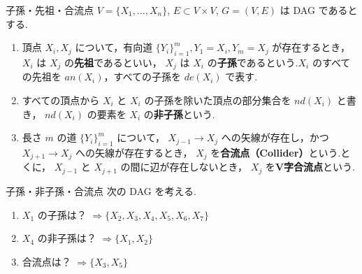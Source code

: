 \documentclass[uplatex, dvipdfmx]{jsarticle}
\begin{document}
\newpage

\begin{defn}{子孫・先祖・合流点}
$V = \{X_1, \dots, X_n\}$, $E \subset V \times V$, $G = (V, E)$ は DAG であるとする.
  \begin{enumerate}
      \item 頂点 $X_i, X_j$ について，有向道 $\{Y_i\}_{i=1}^m, Y_1 = X_i, Y_m = X_j$ が存在するとき， $X_i$ は $X_j$ の\textbf{先祖}であるといい， $X_j$ は $X_i$ の\textbf{子孫}であるという.$X_i$ のすべての先祖を $an(X_i)$，すべての子孫を $de(X_i)$ で表す.
      \item すべての頂点から $X_i$ と $X_i$ の子孫を除いた頂点の部分集合を $nd(X_i)$ と書き， $nd(X_i)$ の要素を $X_i$ の\textbf{非子孫}という.
      \item 長さ $m$ の道 $\{Y_i\}_{i=1}^m$ について， $X_{j-1} \to X_j$ への矢線が存在し，かつ $X_{j+1} \to X_j$ への矢線が存在するとき， $X_j$ を\textbf{合流点（Collider）}という.とくに， $X_{j-1}$ と $X_{j+1}$ の間に辺が存在しないとき， $X_j$ を\textbf{V字合流点}という.
  \end{enumerate}
\end{defn}

\begin{exm}{子孫・非子孫・合流点}
  次の DAG を考える.
  \begin{center}
  \end{center}

  \begin{enumerate}
      \item $X_1$ の子孫は？ $\Rightarrow \{X_2, X_3, X_4, X_5, X_6, X_7\}$
      \item $X_4$ の非子孫は？ $\Rightarrow \{X_1, X_2\}$
      \item 合流点は？ $\Rightarrow \{X_3, X_5\}$
  \end{enumerate}
\end{exm}
\end{document}
